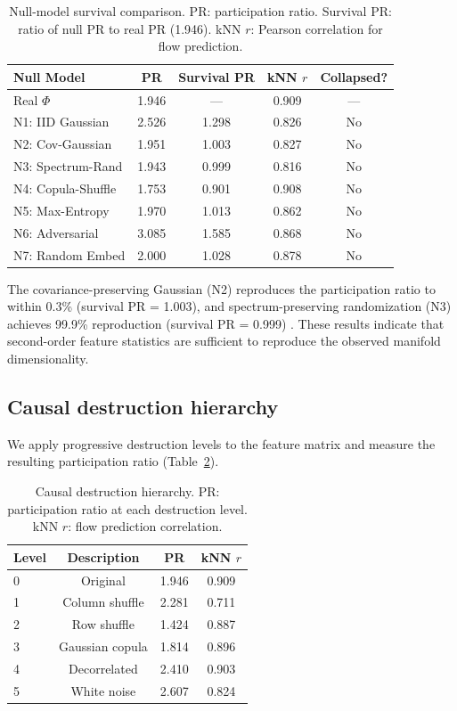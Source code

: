 \documentclass[aip,chaos,showpacs,superscriptaddress,groupedaddress]{revtex4-1}
\begin{document}
\begin{table}[h]
\centering
\caption{Null-model survival comparison. PR: participation ratio. Survival PR: ratio of null PR to real PR (1.946). kNN $r$: Pearson correlation for flow prediction.}
\label{tab:null_survival}
\begin{tabular}{lcccc}
\toprule
Null Model & PR & Survival PR & kNN $r$ & Collapsed? \\
\midrule
Real $\Phi$ & 1.946 & --- & 0.909 & --- \\
N1: IID Gaussian & 2.526 & 1.298 & 0.826 & No \\
N2: Cov-Gaussian & 1.951 & 1.003 & 0.827 & No \\
N3: Spectrum-Rand & 1.943 & 0.999 & 0.816 & No \\
N4: Copula-Shuffle & 1.753 & 0.901 & 0.908 & No \\
N5: Max-Entropy & 1.970 & 1.013 & 0.862 & No \\
N6: Adversarial & 3.085 & 1.585 & 0.868 & No \\
N7: Random Embed & 2.000 & 1.028 & 0.878 & No \\
\bottomrule
\end{tabular}
\end{table}

The covariance-preserving Gaussian (N2) reproduces the participation ratio to within 0.3\% (survival PR = 1.003), and spectrum-preserving randomization (N3) achieves 99.9\% reproduction (survival PR = 0.999) \cite{donoho2000intrinsic}. These results indicate that second-order feature statistics are sufficient to reproduce the observed manifold dimensionality.

\subsection{Causal destruction hierarchy}
\label{sec:destruction_results}

We apply progressive destruction levels to the feature matrix and measure the resulting participation ratio (Table~\ref{tab:destruction}).

\begin{table}[h]
\centering
\caption{Causal destruction hierarchy. PR: participation ratio at each destruction level. kNN $r$: flow prediction correlation.}
\label{tab:destruction}
\begin{tabular}{lccc}
\toprule
Level & Description & PR & kNN $r$ \\
\midrule
0 & Original & 1.946 & 0.909 \\
1 & Column shuffle & 2.281 & 0.711 \\
2 & Row shuffle & 1.424 & 0.887 \\
3 & Gaussian copula & 1.814 & 0.896 \\
4 & Decorrelated & 2.410 & 0.903 \\
5 & White noise & 2.607 & 0.824 \\
\bottomrule
\end{tabular}
\end{table}
\end{document}
